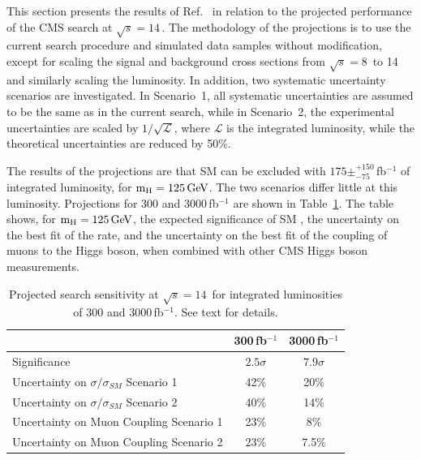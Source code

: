 \documentclass[10pt]{article}
\begin{document}
This section presents the results of Ref.~\cite{CMS:2013xfa} in relation to
the projected performance of the CMS \hmm{} search at $\sqrt{s}=14$\,\TeV{}.
The methodology of the projections is to use the current \hmm{} search
procedure and simulated data samples without modification, except
for scaling the signal and background cross sections from $\sqrt{s}=8$\,\TeV{}
to 14\,\TeV{} and similarly scaling the luminosity.
In addition, two systematic uncertainty scenarios are investigated.
In Scenario~1, all systematic uncertainties are assumed to be the same
as in the current search, while in Scenario~2, the experimental uncertainties
are scaled by $1/\sqrt{\mathcal{L}}$, where $\mathcal{L}$ is the integrated luminosity, 
while the theoretical uncertainties are reduced by 50\%.

The results of the projections are that SM \hmm{} can be excluded with 
$175\pm^{+150}_{-75}$\,fb$^{-1}$ of integrated luminosity, for $\mathrm{m_H}{}=125\,\mathrm{Ge\kern -0.1em V}{}{}$.  
The two scenarios differ little at this luminosity.  
Projections for 300 and 3000\,fb$^{-1}$ are shown in Table~\ref{tab:projTab}.  
The table shows, for $\mathrm{m_H}{}=125\,\mathrm{Ge\kern -0.1em V}{}{}$, the expected significance of SM \hmm{}, the uncertainty
on the best fit of the \hmm{} rate, and the uncertainty on the best fit
of the coupling of muons to the Higgs boson, when combined with other CMS Higgs boson measurements.

\begin{table}[t]
\begin{center}
\caption{Projected \hmm search sensitivity at $\sqrt{s}=14$\,\TeV{} for integrated 
            luminosities of 300 and 3000\,fb$^{-1}$.  See text for details.}
\label{tab:projTab}
  \begin{tabular}{lcc} \hline
      & 300\,fb$^{-1}$ & 3000\,fb$^{-1}$ \\ \hline
    Significance  & $2.5\sigma$ & $7.9\sigma$ \\ 
    Uncertainty on $\sigma/\sigma_{SM}$ Scenario 1  & 42\% & 20\% \\ 
    Uncertainty on $\sigma/\sigma_{SM}$ Scenario 2  & 40\% & 14\% \\ 
    Uncertainty on Muon Coupling Scenario 1  & 23\% & 8\% \\ 
    Uncertainty on Muon Coupling Scenario 2  & 23\% & 7.5\% \\ \hline
  \end{tabular}
\end{center}
\end{table}
\end{document}
